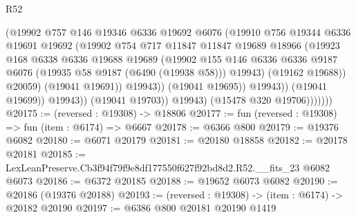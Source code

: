 \begin{lexlean}{R52}
\begin{coremodule}
                                  (@19902
                                    @757
                                    @146
                                    @19346
                                    @6336
                                    @19692
                                    @6076
                                    (@19910
                                      @756
                                      @19344
                                      @6336
                                      @19691
                                      @19692
                                      (@19902
                                        @754
                                        @717
                                        @11847
                                        @11847
                                        @19689
                                        @18966
                                        (@19923
                                          @168
                                          @6338
                                          @6336
                                          @19688
                                          @19689
                                          (@19902
                                            @155
                                            @146
                                            @6336
                                            @6336
                                            @9187
                                            @6076
                                            (@19935 @58 @9187 (@6490 (@19938 @58)))
                                            @19943)
                                          (@19162 @19688))
                                        @20059)
                                      (@19041 @19691))
                                    @19943))
                                (@19041 @19695))
                              @19943))
                          (@19041 @19699))
                        @19943))
                    (@19041 @19703))
                  @19943)
                (@15478 @320 @19706)))))))
@20175 := (reversed : @19308) -> @18806
@20177 := fun (reversed : @19308) => fun (item : @6174) => @6667
@20178 := @6366 @800
@20179 := @19376 @6082
@20180 := @6071 @20179
@20181 := @20180 @18858
@20182 := @20178 @20181
@20185 := LexLeanPreserve.Cb3f94f79f9e8df177550f627f92bd8d2.R52.__fits_23 @6082 @6073
@20186 := @6372 @20185
@20188 := @19652 @6073 @6082
@20190 := @20186 (@19376 @20188)
@20193 := (reversed : @19308) -> (item : @6174) -> @20182 @20190
@20197 := @6386 @800 @20181 @20190 @1419

\end{coremodule}
\end{lexlean}

